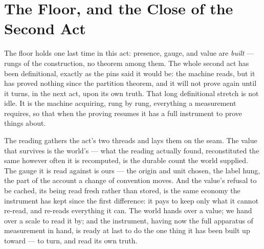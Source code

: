\section{The Floor, and the Close of the Second Act}

The floor holds one last time in this act: presence, gauge, and value are \emph{built} --- rungs of the
construction, no theorem among them. The whole second act has been definitional, exactly as the pins said it
would be: the machine reads, but it has proved nothing since the partition theorem, and it will not
prove again until it turns, in the next act, upon its own truth. That long definitional stretch is not idle. It
is the machine acquiring, rung by rung, everything a measurement requires, so that when the proving resumes it
has a full instrument to prove things about.

The reading gathers the act's two threads and lays them on the seam. The value that survives is the world's ---
what the reading actually found, reconstituted the same however often it is recomputed, is the durable count the
world supplied. The gauge it is read against is ours --- the origin and unit chosen, the label hung, the part of
the account a change of convention moves. And the value's refusal to be cached, its being read fresh rather than
stored, is the same economy the instrument has kept since the first difference: it pays to keep only what it
cannot re-read, and re-reads everything it can. The world hands over a value; we hand over a scale to read it by;
and the instrument, having now the full apparatus of measurement in hand, is ready at last to do the one thing it
has been built up toward --- to turn, and read its own truth.
